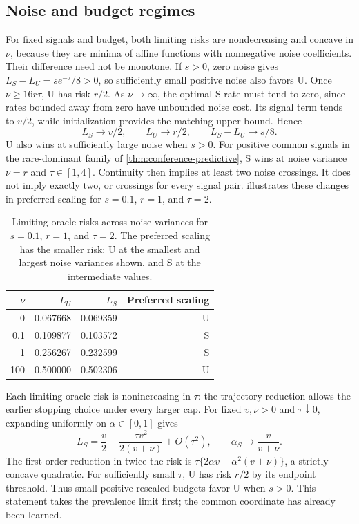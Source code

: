 \documentclass{alt2027}
\begin{document}
\subsection{Noise and budget regimes}
\label{sec:oracle-noise-budget}

For fixed signals and budget, both limiting risks are nondecreasing and concave
in $\nu$, because they are minima of affine functions with nonnegative noise
coefficients. Their difference need not be monotone. If $s > 0$, zero noise
gives $L_S - L_U = se^{-\tau}/8 > 0$, so sufficiently small positive noise also
favors U. Once $\nu \geq 16r\tau$, U has risk $r/2$. As $\nu \to \infty$, the
optimal S rate must tend to zero, since rates bounded away from zero have
unbounded noise cost. Its signal term tends to $v/2$, while initialization
provides the matching upper bound. Hence
\[
  L_S \longrightarrow v/2,\qquad L_U
      \longrightarrow r/2, \qquad L_S - L_U
      \longrightarrow s/8.
\]
U also wins at sufficiently large noise when $s > 0$. For positive common
signals in the rare-dominant family of \cref{thm:conference-predictive}, S wins
at noise variance $\nu = r$ and $\tau \in[1,4]$. Continuity then implies at
least two noise crossings. It does not imply exactly two, or crossings for every
signal pair.  illustrates these changes in
preferred scaling for $s = 0.1$, $r = 1$, and $\tau = 2$.

\begin{table}[htbp]
  \centering
  \begin{tabular}{rrrr}
    \toprule
    $\nu$ &    $L_U$ &    $L_S$ & Preferred scaling \\
    \midrule
        0 & 0.067668 & 0.069359 &                 U \\
      0.1 & 0.109877 & 0.103572 &                 S \\
        1 & 0.256267 & 0.232599 &                 S \\
      100 & 0.500000 & 0.502306 &                 U \\
    \bottomrule
  \end{tabular}
  \caption{
    Limiting oracle risks across noise variances for $s = 0.1$, $r = 1$, and
    $\tau = 2$. The preferred scaling has the smaller risk: U at the smallest
    and largest noise variances shown, and S at the intermediate values.
  }
  \label{tab:oracle-noise-regimes}
\end{table}

Each limiting oracle risk is nonincreasing in $\tau$: the trajectory reduction
allows the earlier stopping choice under every larger cap. For fixed $v,\nu > 0$
and $\tau \downarrow 0$, expanding uniformly on $\alpha \in[0,1]$ gives
\[
  L_S =               \frac v2
                      - \frac{\tau v^2}{2(v + \nu)}
                      + O(\tau^2),\qquad \alpha_S
      \longrightarrow \frac{v}{v + \nu}.
\]
The first-order reduction in twice the risk is
$\tau\{2\alpha v - \alpha^2(v + \nu)\}$, a strictly concave quadratic. For
sufficiently small $\tau$, U has risk $r/2$ by its endpoint threshold. Thus
small positive rescaled budgets favor U when $s > 0$. This statement takes the
prevalence limit first; the common coordinate has already been learned.
\end{document}
